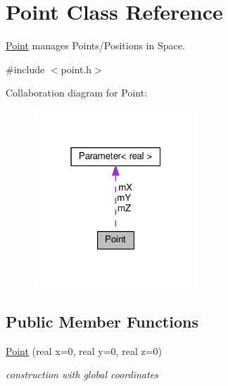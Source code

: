 \hypertarget{classPoint}{}\section{Point Class Reference}
\label{classPoint}


\hyperlink{classPoint}{Point} manages Points/\+Positions in Space.  




{\ttfamily \#include $<$point.\+h$>$}



Collaboration diagram for Point\+:
\nopagebreak
\begin{figure}[H]
\begin{center}
\leavevmode
\includegraphics[width=175pt]{classPoint__coll__graph}
\end{center}
\end{figure}
\subsection*{Public Member Functions}
\begin{DoxyCompactItemize}
\item 
\hyperlink{classPoint_af73f855d0ef3a5f76c63ffc014d28bec}{Point} (real x=0, real y=0, real z=0)
\begin{DoxyCompactList}\small\item\em construction with global coordinates \end{DoxyCompactList}\end{DoxyCompactItemize}
